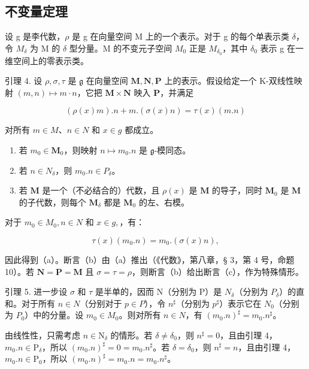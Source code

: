\subsection{不变量定理}

设 g 是李代数，\(\rho\) 是 g 在向量空间 M 上的一个表示。对于 g 的每个单表示类 \(\delta\)，令 \(M_{\delta}\) 为 M 的 \(\delta\) 型分量。M 的不变元子空间 \(M_{0}\) 正是 \(M_{\delta_{0}}\)，其中 \(\delta_{0}\) 表示 g 在一维空间上的零表示类。

引理 4. 设 \(\rho, \sigma, \tau\) 是 \(\mathfrak{g}\) 在向量空间 \(\mathbf{M}, \mathbf{N}, \mathbf{P}\) 上的表示。假设给定一个 K-双线性映射 \((m, n) \mapsto m \cdot n\)，它把 \(\mathbf{M} \times \mathbf{N}\) 映入 \(\mathbf{P}\)，并满足

\[
(\rho (x) m). n + m. (\sigma (x) n) = \tau (x) (m. n)
\]

对所有 \(m \in M\)、\(n \in N\) 和 \(x \in g\) 都成立。

\begin{enumerate}
\def\labelenumi{(\alph{enumi})}
\item
  若 \(m_0 \in \mathbf{M}_0\)，则映射 \(n \mapsto m_0\).\(n\) 是 \(\mathfrak{g}\)-模同态。
\item
  若 \(n \in N_{\delta}\)，则 \(m_{0}.n \in P_{\delta}\)。
\item
  若 \(\mathbf{M}\) 是一个（不必结合的）代数，且 \(\rho(x)\) 是 \(\mathbf{M}\) 的导子，同时 \(\mathbf{M}_0\) 是 \(\mathbf{M}\) 的子代数，则每个 \(\mathbf{M}_{\delta}\) 都是 \(\mathbf{M}_0\) 的左、右模。
\end{enumerate}

对于 \(m_{0} \in M_{0}, n \in N\) 和 \(x \in g,\)，有：

\[
\tau (x) \left(m _ {0}. n\right) = m _ {0}. (\sigma (x) n),
\]

因此得到（a）。断言（b）由（a）推出（《代数》，第八章，§ 3，第 4 号，命题 10）。若 \(\mathbf{N} = \mathbf{P} = \mathbf{M}\) 且 \(\sigma = \tau = \rho\)，则断言（b）给出断言（c），作为特殊情形。

引理 5. 进一步设 \(\sigma\) 和 \(\tau\) 是半单的，因而 N（分别为 P）是 \(N_{\delta}\)（分别为 \(P_{\delta}\)）的直和。对于所有 \(n \in N\)（分别对于 \(p \in P\)），令 \(n^{\sharp}\)（分别为 \(p^{\sharp}\)）表示它在 \(N_0\)（分别为 \(P_0\)）中的分量。设 \(m_0 \in M_0\)。则对所有 \(n \in N\)，有 \((m_0.n)^{\sharp} = m_0.n^{\sharp}\)。

由线性性，只需考虑 \(n \in \mathrm{N}_{\delta}\) 的情形。若 \(\delta \neq \delta_0\)，则 \(n^{\sharp} = 0\)，且由引理 4，\(m_0.n \in \mathrm{P}_{\delta}\)，所以 \((m_0.n)^{\sharp} = 0 = m_0.n^{\sharp}\)。若 \(\delta = \delta_0\)，则 \(n^{\sharp} = n\)，且由引理 4，\(m_0.n \in \mathrm{P}_0\)，所以 \((m_0.n)^{\sharp} = m_0.n = m_0.n^{\sharp}\)。


